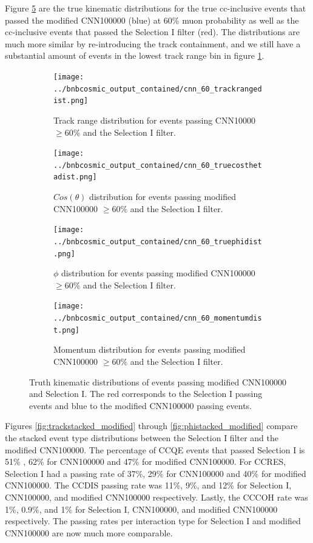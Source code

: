 Figure \ref{fig:truthkinematics_modified} are the true kinematic distributions for the true cc-inclusive events that passed the modified CNN100000 (blue) at 60\% muon probability as well as the cc-inclusive events that passed the Selection I filter (red). The distributions are much more similar by re-introducing the track containment, and we still have a substantial amount of events in the lowest track range bin in figure \ref{fig:cnn60trackrange_modified}.  

\begin{figure}[htp!]
\centering
	\begin{subfigure}[b]{.475\textwidth}
	\centering
		\texttt{[image: ../bnbcosmic\_output\_contained/cnn\_60\_trackrangedist.png]}
		\caption{Track range distribution for events passing CNN10000 $\geq 60\%$ and the Selection I filter.} 
		\label{fig:cnn60trackrange_modified}
	\end{subfigure}
	\quad
	\begin{subfigure}[b]{.475\textwidth}
	\centering
		\texttt{[image: ../bnbcosmic\_output\_contained/cnn\_60\_truecosthetadist.png]}
		\caption{$Cos(\theta)$ distribution for events passing modified CNN100000 $\geq 60\%$ and the Selection I filter.} 
		\label{fig:cnn60costheta_modified}
	\end{subfigure}
	\quad
	\begin{subfigure}[b]{.475\textwidth}
	\centering
		\texttt{[image: ../bnbcosmic\_output\_contained/cnn\_60\_truephidist.png]}
		\caption{$\phi$ distribution for events passing modified CNN100000 $\geq 60\%$ and the Selection I filter.} 
		\label{fig:cnn60phi_modified}
	\end{subfigure}
	\quad
	\begin{subfigure}[b]{.475\textwidth}
	\centering
		\texttt{[image: ../bnbcosmic\_output\_contained/cnn\_60\_momentumdist.png]}
		\caption{Momentum distribution for events passing modified CNN100000 $\geq 60 \%$ and the Selection I filter.} 
		\label{fig:cnn60momentum_modified}
	\end{subfigure}
\caption{Truth kinematic distributions of events passing modified CNN100000 and Selection I. The red corresponds to the Selection I passing events and blue to the modified CNN100000 passing events.}
\label{fig:truthkinematics_modified}
\end{figure}

Figures \ref{fig:trackstacked_modified} through \ref{fig:phistacked_modified} compare the stacked event type distributions between the Selection I filter and the modified CNN100000. The percentage of CCQE events that passed Selection I is 51\% , 62\% for CNN100000 and 47\% for modified CNN100000. For CCRES, Selection I had a passing rate of 37\%, 29\% for CNN100000 and 40\% for modified CNN100000. The CCDIS passing rate was 11\%, 9\%, and 12\% for Selection I, CNN100000, and modified CNN100000 respectively. Lastly, the CCCOH rate was 1\%, 0.9\%, and 1\% for Selection I, CNN100000, and modified CNN100000 respectively. The passing rates per interaction type for Selection I and modified CNN100000 are now much more comparable.  

